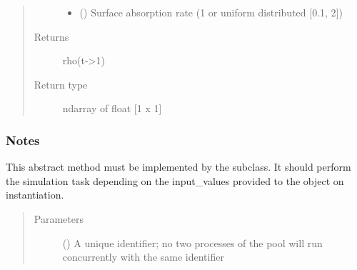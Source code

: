 \documentclass[letterpaper,10pt,english,openany,oneside]{sphinxmanual}
\begin{document}
\begin{fulllineitems}
\begin{quote}
\begin{description}
\begin{itemize}
\item {} 
\sphinxstyleliteralstrong{\sphinxupquote{{[}}}\sphinxstyleliteralstrong{\sphinxupquote{{]}}} (\sphinxstyleliteralemphasis{\sphinxupquote{ {[}}}\sphinxstyleliteralemphasis{\sphinxupquote{{]}}}) \textendash{} Surface absorption rate (1 or uniform distributed {[}0.1, 2{]})

\end{itemize}

\item[{Returns}] \leavevmode
{} \textendash{} rho(t-\textgreater{}1)

\item[{Return type}] \leavevmode
ndarray of float {[}1 x 1{]}

\end{description}\end{quote}
\subsubsection*{Notes}

\begin{figure}[htbp]
\centering

\noindent{}
\end{figure}

\begin{fulllineitems}
\label{\detokenize{pygpc.testfunctions:pygpc.testfunctions.testfunctions.SurfaceCoverageSpecies.simulate}}
This abstract method must be implemented by the subclass.
It should perform the simulation task depending on the input\_values provided to the object on instantiation.
\begin{quote}\begin{description}
\item[{Parameters}] \leavevmode
{} () \textendash{} A unique identifier; no two processes of the pool will run concurrently with the same identifier


\end{description}
\end{quote}
\end{fulllineitems}
\end{fulllineitems}
\end{document}
